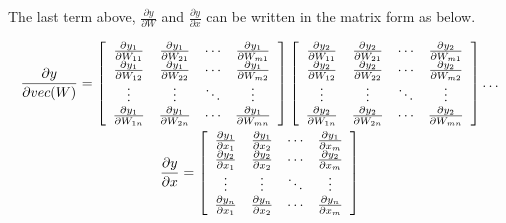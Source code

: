 \documentclass[a4paper]{article}
\begin{document}
The last term above, $\frac { \partial y } { \partial W }$ and $\frac { \partial y } { \partial x }$ can be written in the matrix form as below.

\begin{equation}
\begin{gathered}
    \frac { \partial y } { \partial vec(W) } = \left[ \begin{array} { c c c c } { \frac { \partial y _ { 1 } } { \partial W _ { 11 } } } & { \frac { \partial y _ { 1 } } { \partial W _ { 21 } } } & { \cdots } & { \frac { \partial y _ { 1 } } { \partial W _ { m1 } } } \\ { \frac { \partial y _ { 1 } } { \partial W _ { 12 } } } & { \frac { \partial y _ { 1 } } { \partial W _ { 22 } } } & { \cdots } & { \frac { \partial y _ { 1 } } { \partial W _ { m2 } } } \\ 
    {\vdots} & {\vdots} & {\ddots} & {\vdots} \\
    { \frac { \partial y _ { 1 } } { \partial W _ { 1n } } } & { \frac { \partial y _ { 1 } } { \partial W _ { 2n } } } & { \cdots } & { \frac { \partial y _ { 1 } } { \partial W _ { mn } } } \end{array} \right]
    \left[ \begin{array} { c c c c } { \frac { \partial y _ { 2 } } { \partial W _ { 11 } } } & { \frac { \partial y _ { 2 } } { \partial W _ { 21 } } } & { \cdots } & { \frac { \partial y _ { 2 } } { \partial W _ { m1 } } } \\ { \frac { \partial y _ { 2 } } { \partial W _ { 12 } } } & { \frac { \partial y _ { 2 } } { \partial W _ { 22 } } } & { \cdots } & { \frac { \partial y _ { 2 } } { \partial W _ { m2 } } } \\ 
    {\vdots} & {\vdots} & {\ddots} & {\vdots} \\
    { \frac { \partial y _ { 2 } } { \partial W _ { 1n } } } & { \frac { \partial y _ { 2 } } { \partial W _ { 2n } } } & { \cdots } & { \frac { \partial y _ { 2 } } { \partial W _ { mn } } } \end{array} \right] \dots \\
    \frac { \partial y } { \partial x } = \left[ \begin{array} { c c c c } { \frac { \partial y _ { 1 } } { \partial x _ { 1 } } } & { \frac { \partial y _ { 1 } } { \partial x _ { 2 } } } & { \cdots } & { \frac { \partial y _ { 1 } } { \partial x _ { m } } } \\ { \frac { \partial y _ { 2 } } { \partial x _ { 1 } } } & { \frac { \partial y _ { 2 } } { \partial x _ { 2 } } } & { \cdots } & { \frac { \partial y _ { 2 } } { \partial x _ { m } } } \\ 
    {\vdots} & {\vdots} & {\ddots} & {\vdots} \\
    { \frac { \partial y _ { n } } { \partial x _ { 1 } } } & { \frac { \partial y _ { n } } { \partial x _ { 2 } } } & { \cdots } & { \frac { \partial y _ { n } } { \partial x _ { m } } } \end{array} \right]
\end{gathered}
\end{equation}
\end{document}
